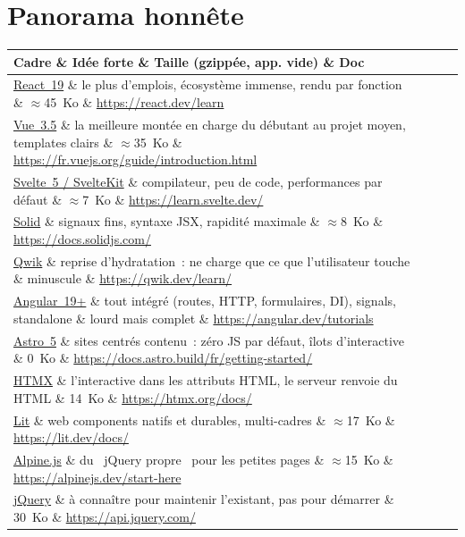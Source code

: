 \documentclass[12pt,a4paper,twoside,openright]{book}
\makeatletter
\newcommand{\link}[2]{\href{#2}{#1}}
\newenvironment{tabz}[1]{\rowcolors{2}{white}{tralight}%
  \small\setlength{\tabcolsep}{5pt}\setlength{\LTpre}{3pt}\setlength{\LTpost}{3pt}%
  \begin{longtable}{@{}#1@{}}\toprule}
  {\bottomrule\end{longtable}\normalfont\setlength{\tabcolsep}{6pt}}
\newcommand{\thd}[1]{\textbf{\color{white}#1}}
\newcommand{\headrow}{\rowcolor{theadbg}}
\makeatother
\begin{document}
\section{Panorama honn\^ete}

\begin{tabz}{lXlX}
  \headrow \thd{Cadre} \& \thd{Id\'ee forte} \& \thd{Taille (gzipp\'ee, app. vide)} \& \thd{Doc} \\
  \midrule
  \link{React~19}{https://react.dev/} \& le plus d'emplois, \'ecosyst\`eme immense, rendu par fonction \& $\approx$45~Ko \& \url{https://react.dev/learn} \\
  \link{Vue~3.5}{https://fr.vuejs.org/} \& la meilleure mont\'ee en charge du d\'ebutant au projet moyen, templates clairs \& $\approx$35~Ko \& \url{https://fr.vuejs.org/guide/introduction.html} \\
  \link{Svelte~5 / SvelteKit}{https://svelte.dev/} \& compilateur, peu de code, performances par d\'efaut \& $\approx$7~Ko \& \url{https://learn.svelte.dev/} \\
  \link{Solid}{https://www.solidjs.com/} \& signaux fins, syntaxe JSX, rapidit\'e maximale \& $\approx$8~Ko \& \url{https://docs.solidjs.com/} \\
  \link{Qwik}{https://qwik.dev/} \& reprise d'hydratation~: ne charge que ce que l'utilisateur touche \& minuscule \& \url{https://qwik.dev/learn/} \\
  \link{Angular~19+}{https://angular.dev/} \& tout int\'egr\'e (routes, HTTP, formulaires, DI), signals, standalone \& lourd mais complet \& \url{https://angular.dev/tutorials} \\
  \link{Astro~5}{https://astro.build/} \& sites centr\'es contenu~: z\'ero JS par d\'efaut, \^ilots d'interactive \& 0~Ko \& \url{https://docs.astro.build/fr/getting-started/} \\
  \link{HTMX}{https://htmx.org/} \& l'interactive dans les attributs HTML, le serveur renvoie du HTML \& 14~Ko \& \url{https://htmx.org/docs/} \\
  \link{Lit}{https://lit.dev/} \& web components natifs et durables, multi-cadres \& $\approx$17~Ko \& \url{https://lit.dev/docs/} \\
  \link{Alpine.js}{https://alpinejs.dev/} \& du \og ~jQuery propre~ \fg{} pour les petites pages \& $\approx$15~Ko \& \url{https://alpinejs.dev/start-here} \\
  \link{jQuery}{https://jquery.com/} \& \`a conna\^itre pour maintenir l'existant, pas pour d\'emarrer \& 30~Ko \& \url{https://api.jquery.com/} \\
\end{tabz}
\end{document}
